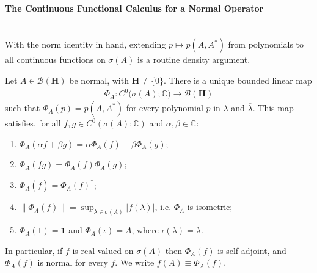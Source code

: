 \paragraph{The Continuous Functional Calculus for a Normal Operator}\mbox{}\\
With the norm identity in hand, extending $p \mapsto p(A,A^*)$ from polynomials to all continuous functions on $\sigma(A)$ is a routine density argument.

\begin{theorem}
    \label{thrm:continuous-functional-calculus-normal}
    \leanok
    Let $A \in \mathcal{B}(\mathbf{H})$ be normal, with $\mathbf{H} \ne \{0\}$. There is a unique bounded linear map
    \begin{align}
        \Phi_A : C^0\big( \sigma(A); \mathbb{C} \big) \longrightarrow \mathcal{B}(\mathbf{H})
    \end{align}
    such that $\Phi_A(p) = p(A,A^*)$ for every polynomial $p$ in $\lambda$ and $\overline\lambda$. This map satisfies, for all $f,g \in C^0(\sigma(A);\mathbb{C})$ and $\alpha,\beta \in \mathbb{C}$:
    \begin{enumerate}
        \item $\Phi_A(\alpha f + \beta g) = \alpha\Phi_A(f) + \beta\Phi_A(g)$;
        \item $\Phi_A(fg) = \Phi_A(f)\Phi_A(g)$;
        \item $\Phi_A(\overline{f}) = \Phi_A(f)^*$;
        \item $\left\| \Phi_A(f) \right\| = \sup_{\lambda \in \sigma(A)} \lvert f(\lambda) \rvert$, i.e. $\Phi_A$ is isometric;
        \item $\Phi_A(1) = \mathbf{1}$ and $\Phi_A(\iota) = A$, where $\iota(\lambda) = \lambda$.
    \end{enumerate}
    In particular, if $f$ is real-valued on $\sigma(A)$ then $\Phi_A(f)$ is self-adjoint, and $\Phi_A(f)$ is normal for every $f$. We write $f(A) \equiv \Phi_A(f)$.
\end{theorem}

